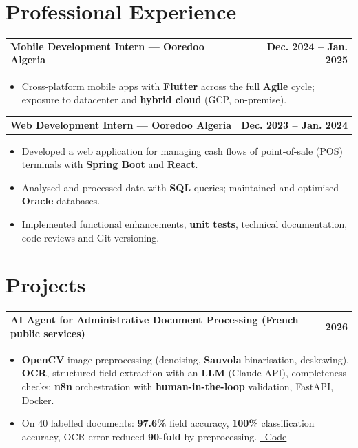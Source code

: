 \documentclass[a4paper,10pt]{article}
\makeatletter
\newenvironment{joblong}[2]
{\begin{tabularx}{\linewidth}{@{}X r@{}}\textbf{#1} & \textbf{#2}\\[2pt]\end{tabularx}\begin{itemize}}
{\end{itemize}}
\makeatother
\begin{document}
\section{Professional Experience}

\begin{joblong}{Mobile Development Intern — Ooredoo Algeria}{Dec. 2024 -- Jan. 2025}
\item Cross-platform mobile apps with \textbf{Flutter} across the full \textbf{Agile} cycle; exposure to datacenter and \textbf{hybrid cloud} (GCP, on-premise).
\end{joblong}

\begin{joblong}{Web Development Intern — Ooredoo Algeria}{Dec. 2023 -- Jan. 2024}
\item Developed a web application for managing cash flows of point-of-sale (POS) terminals with \textbf{Spring Boot} and \textbf{React}.
\item Analysed and processed data with \textbf{SQL} queries; maintained and optimised \textbf{Oracle} databases.
\item Implemented functional enhancements, \textbf{unit tests}, technical documentation, code reviews and Git versioning.
\end{joblong}

\section{Projects}

\begin{joblong}{AI Agent for Administrative Document Processing (French public services)}{2026}
\item \textbf{OpenCV} image preprocessing (denoising, \textbf{Sauvola} binarisation, deskewing), \textbf{OCR}, structured field extraction with an \textbf{LLM} (Claude API), completeness checks; \textbf{n8n} orchestration with \textbf{human-in-the-loop} validation, FastAPI, Docker.
\item On 40 labelled documents: \textbf{97.6\%} field accuracy, \textbf{100\%} classification accuracy, OCR error reduced \textbf{90-fold} by preprocessing. \href{https://github.com/adkebaily/agent-dossiers-administratifs}{\faGithub\ Code}
\end{joblong}
\end{document}
